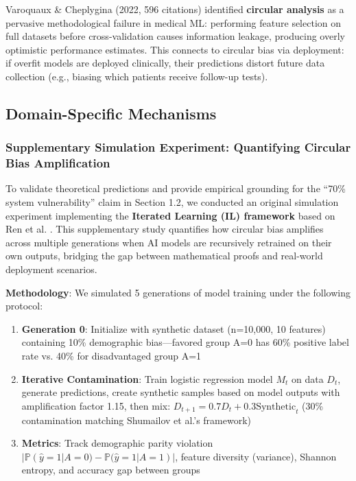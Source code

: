 \documentclass[11pt,a4paper]{article}
\begin{document}
Varoquaux \& Cheplygina \cite{varoquaux2022} (2022, 596 citations) identified \textbf{circular analysis} as a pervasive methodological failure in medical ML: performing feature selection on full datasets before cross-validation causes information leakage, producing overly optimistic performance estimates. This connects to circular bias via deployment: if overfit models are deployed clinically, their predictions distort future data collection (e.g., biasing which patients receive follow-up tests).

\subsection{Domain-Specific Mechanisms}

\subsubsection{Supplementary Simulation Experiment: Quantifying Circular Bias Amplification}

To validate theoretical predictions and provide empirical grounding for the ``70\% system vulnerability'' claim in Section 1.2, we conducted an original simulation experiment implementing the \textbf{Iterated Learning (IL) framework} based on Ren et al. \cite{ren2024}. This supplementary study quantifies how circular bias amplifies across multiple generations when AI models are recursively retrained on their own outputs, bridging the gap between mathematical proofs \cite{shumailov2024} and real-world deployment scenarios.

\textbf{Methodology}:  
We simulated 5 generations of model training under the following protocol:
\begin{enumerate}
    \item \textbf{Generation 0}: Initialize with synthetic dataset (n=10,000, 10 features) containing 10\% demographic bias—favored group A=0 has 60\% positive label rate vs. 40\% for disadvantaged group A=1
    \item \textbf{Iterative Contamination}: Train logistic regression model $M_t$ on data $D_t$, generate predictions, create synthetic samples based on model outputs with amplification factor 1.15, then mix: $D_{t+1} = 0.7 D_t + 0.3 \text{Synthetic}_t$ (30\% contamination matching Shumailov et al.'s \cite{shumailov2024} framework)
    \item \textbf{Metrics}: Track demographic parity violation $|\mathbb{P}(\hat{y}=1|A=0) - \mathbb{P}(\hat{y}=1|A=1)|$, feature diversity (variance), Shannon entropy, and accuracy gap between groups
\end{enumerate}
\end{document}
